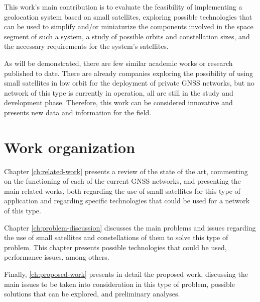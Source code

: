 This work's main contribution is to evaluate the feasibility of implementing a geolocation system based on small satellites, exploring possible technologies that can be used to simplify and/or miniaturize the components involved in the space segment of such a system, a study of possible orbits and constellation sizes, and the necessary requirements for the system's satellites.

As will be demonstrated, there are few similar academic works or research published to date. There are already companies exploring the possibility of using small satellites in low orbit for the deployment of private GNSS networks, but no network of this type is currently in operation, all are still in the study and development phase. Therefore, this work can be considered innovative and presents new data and information for the field.

\section{Work organization}




Chapter \ref{ch:related-work} presents a review of the state of the art, commenting on the functioning of each of the current GNSS networks, and presenting the main related works, both regarding the use of small satellites for this type of application and regarding specific technologies that could be used for a network of this type.

Chapter \ref{ch:problem-discussion} discusses the main problems and issues regarding the use of small satellites and constellations of them to solve this type of problem. This chapter presents possible technologies that could be used, performance issues, among others.

Finally, \autoref{ch:proposed-work} presents in detail the proposed work, discussing the main issues to be taken into consideration in this type of problem, possible solutions that can be explored, and preliminary analyses.